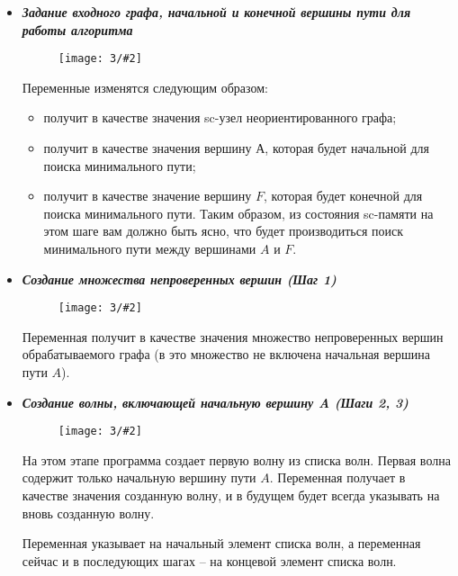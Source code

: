 \newenvironment{algostep}[3]
{
  \newpage
  \label{astep:#2}
  \item \emph{\textbf{#1}}
  
  \begin{figure}[h!]
    \centering
    \texttt{[image: 3/\#2]}
  \end{figure}
}
{
}

\begin{itemize}
\begin{algostep}{Задание входного графа, начальной и конечной вершины
    пути для работы алгоритма}{S1_Input_graph}{0.8}
  
  Переменные изменятся следующим образом:

  \begin{itemize}
  \item {} получит в качестве значения sc-узел
    неориентированного графа;
  \item {} получит в качестве
    значения вершину А, которая будет начальной для поиска минимального
    пути;
  \item {} получит в качестве значение вершину $F$,
    которая будет конечной для поиска минимального пути.  Таким образом,
    из состояния sc-памяти на этом шаге вам должно быть ясно, что будет
    производиться поиск минимального пути между вершинами $A$ и $F$.
  \end{itemize}
\end{algostep}


\begin{algostep}{Создание множества непроверенных вершин (Шаг
    1)}{S2_Create_unchecked_vertexes_set}{0.8}

  Переменная  получит в качестве значения
  множество непроверенных вершин обрабатываемого графа (в это множество
  не включена начальная вершина пути $A$).
\end{algostep}


\begin{algostep}{Создание волны, включающей начальную вершину A (Шаги
    2, 3)}{S3_Create_1st_wave}{0.8}

  На этом этапе программа создает первую волну из списка волн. Первая
  волна содержит только начальную вершину пути $A$. Переменная
   получает в качестве значения созданную волну, и в
  будущем будет всегда указывать на вновь созданную волну.

  Переменная  указывает на начальный элемент
  списка волн, а переменная  сейчас и в
  последующих шагах – на концевой элемент списка волн.
\end{algostep}



\end{itemize}
